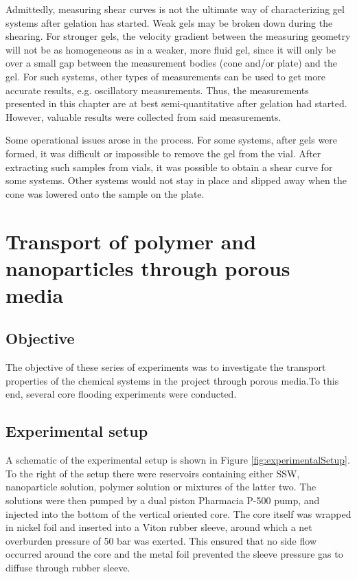 Admittedly, measuring shear curves is not the ultimate way of characterizing gel systems after gelation has started. Weak gels may be broken down during the shearing. For stronger gels, the velocity gradient between the measuring geometry will not be as homogeneous as in a weaker, more fluid gel, since it will only be over a small gap between the measurement bodies (cone and/or plate) and the gel. For such systems, other types of measurements can be used to get more accurate results, e.g. oscillatory measurements. Thus, the measurements presented in this chapter are at best semi-quantitative after gelation had started. However, valuable results were collected from said measurements.

Some operational issues arose in the process. For some systems, after gels were formed, it was difficult or impossible to remove the gel from the vial. After extracting such samples from vials, it was possible to obtain a shear curve for some systems. Other systems would not stay in place and slipped away when the cone was lowered onto the sample on the plate.

\section{Transport of polymer and nanoparticles through porous media}
\subsection{Objective}
The objective of these series of experiments was to investigate the transport properties of the chemical systems in the project through porous media.To this end, several core flooding experiments were conducted.

\subsection{Experimental setup}
A schematic of the experimental setup is shown in Figure \ref{fig:experimentalSetup}. To the right of the setup there were reservoirs containing either SSW, nanoparticle solution, polymer solution or mixtures of the latter two. The solutions were then pumped by a dual piston Pharmacia P-500 pump, and injected into the bottom of the vertical oriented core. The core itself was wrapped in nickel foil and inserted into a Viton rubber sleeve, around which a net overburden pressure of 50 bar was exerted. This ensured that no side flow occurred around the core and the metal foil prevented the sleeve pressure gas to diffuse through rubber sleeve.

